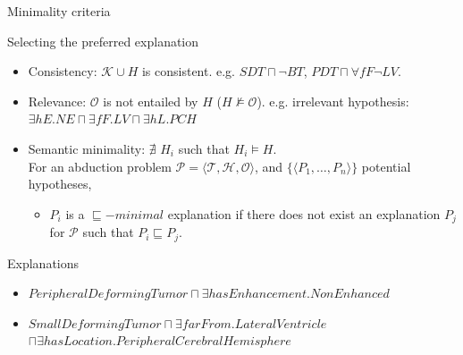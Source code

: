 \documentclass{beamer}
\begin{document}
\begin{frame}{Minimality criteria}
\begin{block}{Selecting the preferred explanation}
\begin{itemize}
  \item Consistency: $\mathcal{K}\cup H$ is consistent.  e.g. $SDT \sqcap \neg BT$, $PDT \sqcap \forall fF \neg LV$.
  \item Relevance: $\mathcal{O}$ is not entailed by $H$ ($H\nvDash \mathcal{O}$). e.g. irrelevant hypothesis: $\exists hE. NE \sqcap \exists fF. LV \sqcap \exists hL.PCH $
  \item Semantic minimality: $\nexists$ $H_i$ such that $H_i\vDash H$.\\
  For an abduction problem $\mathcal{P}=\langle \mathcal{T},\mathcal{H}, \mathcal{O}\rangle$, and $\{\langle P_{1},\dots,P_{n}\rangle\}$ potential hypotheses,
\begin{itemize}
\item  $P_{i}$ is a $\sqsubseteq -minimal$ explanation if there does not exist an explanation $P_{j}$ for $\mathcal{P}$ such that $P_{i}\sqsubseteq P_{j}$.
\end{itemize}
 \end{itemize}
\end{block}

\begin{exampleblock}{Explanations}
 \begin{itemize}
 \item $PeripheralDeformingTumor \sqcap \exists hasEnhancement. NonEnhanced$
 \item $SmallDeformingTumor\sqcap \exists farFrom. LateralVentricle $\\ $\sqcap \exists hasLocation. PeripheralCerebralHemisphere$
\end{itemize}
\end{exampleblock}
\end{frame}
\end{document}
